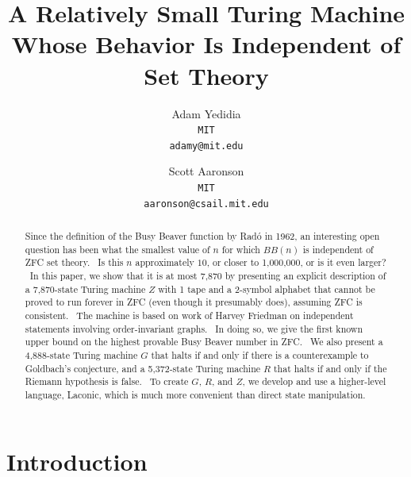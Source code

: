\documentclass[11pt]{article}
\newcommand{\statenumstate}{7,870-state }
\newcommand{\statenum}{7,870 }
\newcommand{\gbstatenumstate}{4,888-state }
\newcommand{\rmstatenumstate}{5,372-state }
\begin{document}
\title{A Relatively Small Turing Machine Whose Behavior Is Independent of Set Theory}
\author{
    Adam Yedidia\\
    \small\texttt{MIT}\\
    \small\texttt{adamy@mit.edu}
    \and
    Scott Aaronson\\
    \small\texttt{MIT}\\
    \small\texttt{aaronson@csail.mit.edu}
}
\maketitle

\begin{abstract}

Since the definition of the Busy Beaver function by Rad\'{o} in 1962, an interesting open question has been what the smallest value of $n$ for which $BB(n)$ is independent of ZFC set theory. \ Is this $n$ approximately $10$, or closer to 1,000,000, or is it even larger? \ In this paper, we show that it is at most \statenum by presenting an explicit description of a \statenumstate Turing machine $Z$ with 1 tape and a 2-symbol alphabet that cannot be proved to run forever in ZFC (even though it presumably does), assuming ZFC is consistent. \ The machine is based on work of Harvey Friedman on independent statements involving order-invariant graphs. \ In doing so, we give the first known upper bound on the highest provable Busy Beaver number in ZFC. \ We also present a \gbstatenumstate Turing machine $G$ that halts if and only if there is a counterexample to Goldbach's conjecture, and a \rmstatenumstate Turing machine $R$ that halts if and only if the Riemann hypothesis is false. \ To create $G$, $R$, and $Z$, we develop and use a higher-level language, Laconic, which is much more convenient than direct state manipulation.

\end{abstract}

\section{Introduction}

\end{document}
